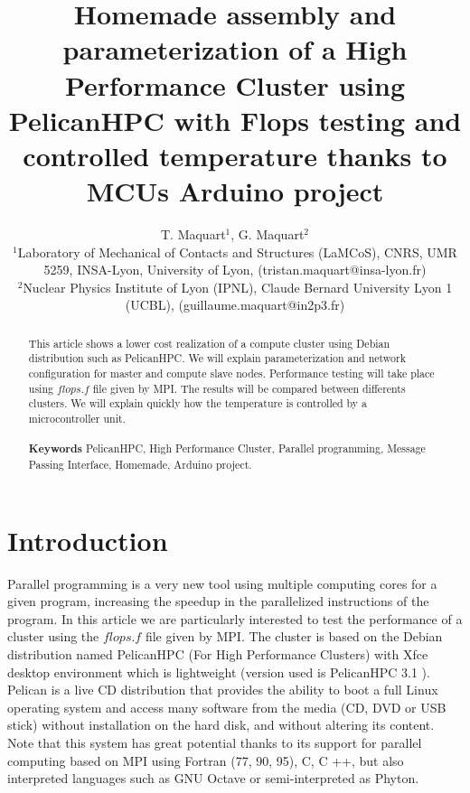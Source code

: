 \documentclass[11pt,a4paper]{article}
\title{Homemade assembly and parameterization of a High Performance Cluster using PelicanHPC with Flops testing and controlled temperature thanks to MCUs Arduino project}
\author{T. Maquart$^1$, G. Maquart$^2$\\$^1$Laboratory of Mechanical of Contacts and Structures (LaMCoS), CNRS, UMR 5259, INSA-Lyon,  University of Lyon, (tristan.maquart@insa-lyon.fr)\\$^2$Nuclear Physics Institute of Lyon (IPNL), Claude Bernard University Lyon 1 (UCBL), (guillaume.maquart@in2p3.fr)}
\begin{document}
\maketitle
\begin{abstract}
\noindent
This article shows a lower cost realization of a compute cluster using Debian distribution such as PelicanHPC.
We will explain parameterization and network configuration for master and compute slave nodes. Performance testing will take place using $flops.f$ file given by MPI. The results will be compared between differents clusters. We will explain quickly how the temperature is controlled by a microcontroller unit. \\\\
\textbf{Keywords} PelicanHPC, High Performance Cluster, Parallel programming, Message Passing Interface, Homemade, Arduino project.
\end{abstract}
\section{Introduction}
\noindent
Parallel programming is a very new tool using multiple computing cores for a given program, increasing the speedup in the parallelized instructions of the program. In this article we are particularly interested to test the performance of a cluster using the $flops.f$ file given by MPI. The cluster is based on the Debian distribution named PelicanHPC \cite{pelicanHPC} (For High Performance Clusters) with Xfce desktop environment which is lightweight (version used is PelicanHPC 3.1 \cite{down1}). Pelican is a live CD distribution that provides the ability to boot a full Linux operating system and access many software from the media (CD, DVD or USB stick) without installation on the hard disk, and without altering its content. Note that this system has great potential thanks to its support for parallel computing based on MPI using Fortran (77, 90, 95), C, C ++, but also interpreted languages ​​such as GNU Octave or semi-interpreted as Phyton.
\end{document}
